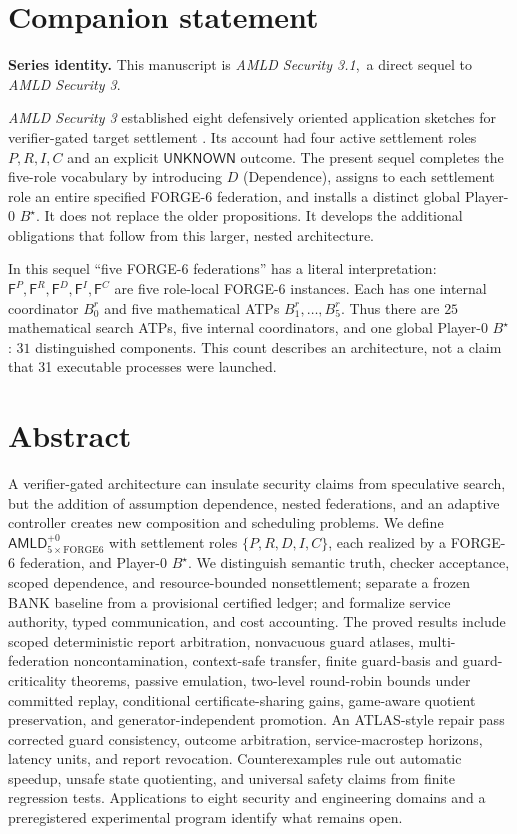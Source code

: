 \documentclass[11pt,letterpaper,oneside]{book}
\theoremstyle{definition}
\theoremstyle{remark}
\newcommand{\F}{\mathsf F}
\begin{document}
\chapter*{Companion statement}
\noindent\textbf{Series identity.} This manuscript is \emph{AMLD Security 3.1},\ a direct sequel to \emph{AMLD Security 3}.\par\medskip
\emph{AMLD Security 3} established eight defensively oriented application sketches for
verifier-gated target settlement \cite{security3}. Its account had four active settlement
roles $P,R,I,C$ and an explicit $\mathsf{UNKNOWN}$ outcome. The present sequel completes
the five-role vocabulary by introducing $D$ (Dependence), assigns to each settlement
role an entire specified FORGE-6 federation, and installs a distinct global
Player-0 $B^\star$. It does not replace the older propositions. It develops the
additional obligations that follow from this larger, nested architecture.

In this sequel ``five FORGE-6 federations'' has a literal interpretation:
$\F^P,\F^R,\F^D,\F^I,\F^C$ are five role-local FORGE-6 instances. Each has one internal
coordinator $B_0^r$ and five mathematical ATPs $B_1^r,\ldots,B_5^r$. Thus there
are $25$ mathematical search ATPs, five internal coordinators, and one global
Player-0 $B^\star$: $31$ distinguished components. This count describes an
architecture, not a claim that 31 executable processes were launched.

\chapter*{Abstract}
A verifier-gated architecture can insulate security claims from speculative
search, but the addition of assumption dependence, nested federations, and an
adaptive controller creates new composition and scheduling problems. We define
$\mathsf{AMLD}^{+0}_{5\times\mathrm{FORGE6}}$ with settlement roles
$\{P,R,D,I,C\}$, each realized by a FORGE-6 federation, and Player-0 $B^\star$.
We distinguish semantic truth, checker acceptance, scoped dependence, and
resource-bounded nonsettlement; separate a frozen BANK baseline from a provisional
certified ledger; and formalize service authority, typed communication, and
cost accounting. The proved results include scoped deterministic report arbitration, nonvacuous guard atlases, multi-federation noncontamination,
context-safe transfer, finite guard-basis and guard-criticality theorems,
passive emulation, two-level round-robin bounds under committed replay,
conditional certificate-sharing gains, game-aware quotient preservation,
and generator-independent promotion. An ATLAS-style repair pass corrected guard consistency, outcome arbitration, service-macrostep horizons, latency units, and report revocation. Counterexamples rule out automatic
speedup, unsafe state quotienting, and universal safety claims from finite
regression tests. Applications to eight security and engineering domains and a
preregistered experimental program identify what remains open.
\end{document}
